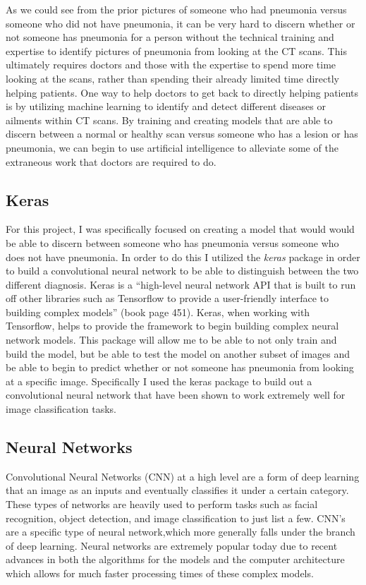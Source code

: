 \documentclass[12pt]{article}
\begin{document}
As we could see from the prior pictures of someone who had pneumonia
versus someone who did not have pneumonia, it can be very hard to
discern whether or not someone has pneumonia for a person without the
technical training and expertise to identify pictures of pneumonia from
looking at the CT scans. This ultimately requires doctors and those with
the expertise to spend more time looking at the scans, rather than
spending their already limited time directly helping patients. One way
to help doctors to get back to directly helping patients is by utilizing
machine learning to identify and detect different diseases or ailments
within CT scans. By training and creating models that are able to
discern between a normal or healthy scan versus someone who has a lesion
or has pneumonia, we can begin to use artificial intelligence to
alleviate some of the extraneous work that doctors are required to do.

\hypertarget{keras}{%
\subsection{Keras}\label{keras}}

For this project, I was specifically focused on creating a model that
would would be able to discern between someone who has pneumonia versus
someone who does not have pneumonia. In order to do this I utilized the
\emph{keras} package in order to build a convolutional neural network to
be able to distinguish between the two different diagnosis. Keras is a
``high-level neural network API that is built to run off other libraries
such as Tensorflow to provide a user-friendly interface to building
complex models'' (book page 451). Keras, when working with Tensorflow,
helps to provide the framework to begin building complex neural network
models. This package will allow me to be able to not only train and
build the model, but be able to test the model on another subset of
images and be able to begin to predict whether or not someone has
pneumonia from looking at a specific image. Specifically I used the
keras package to build out a convolutional neural network that have been
shown to work extremely well for image classification tasks.

\hypertarget{neural-networks}{%
\subsection{Neural Networks}\label{neural-networks}}

Convolutional Neural Networks (CNN) at a high level are a form of deep
learning that an image as an inputs and eventually classifies it under a
certain category. These types of networks are heavily used to perform
tasks such as facial recognition, object detection, and image
classification to just list a few. CNN's are a specific type of neural
network,which more generally falls under the branch of deep learning.
Neural networks are extremely popular today due to recent advances in
both the algorithms for the models and the computer architecture which
allows for much faster processing times of these complex models.
\end{document}

